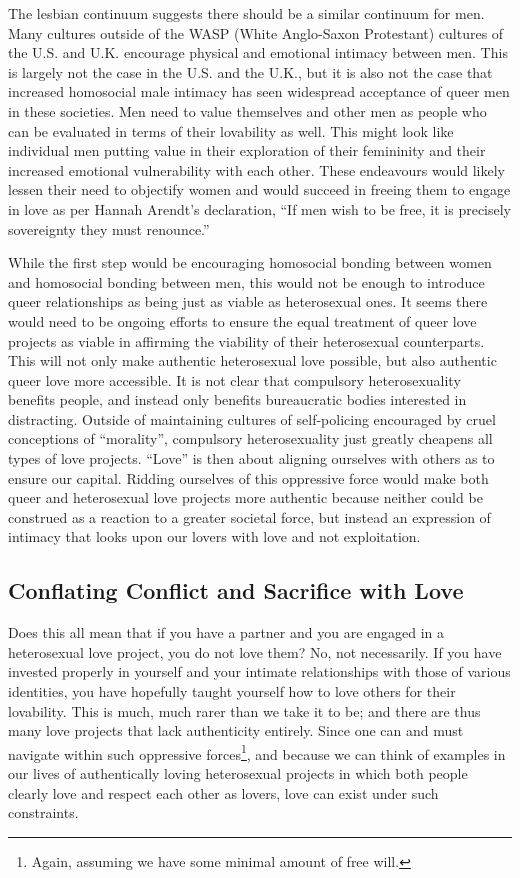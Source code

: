 The lesbian continuum suggests there should be a similar continuum for
men. Many cultures outside of the WASP (White Anglo-Saxon Protestant)
cultures of the U.S. and U.K. encourage physical and emotional intimacy
between men. This is largely not the case in the U.S. and the U.K., but
it is also not the case that increased homosocial male intimacy has seen
widespread acceptance of queer men in these societies. Men need to value
themselves and other men as people who can be evaluated in terms of
their lovability as well. This might look like individual men putting
value in their exploration of their femininity and their increased
emotional vulnerability with each other. These endeavours would likely
lessen their need to objectify women and would succeed in freeing them
to engage in love as per Hannah Arendt's declaration, ``If men wish to
be free, it is precisely sovereignty they must renounce.''

While the first step would be encouraging homosocial bonding between
women and homosocial bonding between men, this would not be enough to
introduce queer relationships as being just as viable as heterosexual
ones. It seems there would need to be ongoing efforts to ensure the
equal treatment of queer love projects as viable in affirming the
viability of their heterosexual counterparts. This will not only make
authentic heterosexual love possible, but also authentic queer love more
accessible. It is not clear that compulsory heterosexuality benefits
people, and instead only benefits bureaucratic bodies interested in
distracting. Outside of maintaining cultures of self-policing encouraged
by cruel conceptions of ``morality'', compulsory heterosexuality just
greatly cheapens all types of love projects. ``Love'' is then about
aligning ourselves with others as to ensure our capital. Ridding
ourselves of this oppressive force would make both queer and
heterosexual love projects more authentic because neither could be
construed as a reaction to a greater societal force, but instead an
expression of intimacy that looks upon our lovers with love and not
exploitation.

\subsection{Conflating Conflict and Sacrifice with Love}

Does this all mean that if you have a partner and you are engaged in a
heterosexual love project, you do not love them? No, not necessarily. If
you have invested properly in yourself and your intimate relationships
with those of various identities, you have hopefully taught yourself how
to love others for their lovability. This is much, much rarer than we
take it to be; and there are thus many love projects that lack
authenticity entirely. Since one can and must navigate within such
oppressive forces\footnote{Again, assuming we have some minimal amount
  of free will.}, and because we can think of examples in our lives of
authentically loving heterosexual projects in which both people clearly
love and respect each other as lovers, love can exist under such
constraints.

